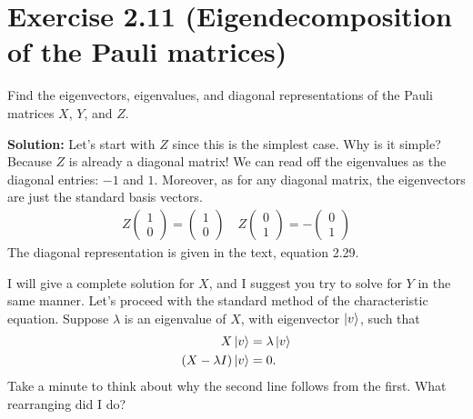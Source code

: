 \documentclass{book}
\begin{document}
\section*{Exercise 2.11 (Eigendecomposition of the Pauli matrices)}
    Find the eigenvectors, eigenvalues, and diagonal representations of the Pauli matrices $X$, $Y$, and $Z$.
    
    \textbf{Solution:} Let's start with $Z$ since this is the simplest case. Why is it simple? Because $Z$ is already a diagonal matrix! We can read off the eigenvalues as the diagonal entries: $-1$ and $1$. Moreover, as for any diagonal matrix, the eigenvectors are just the standard basis vectors.
    \begin{align}
        Z \begin{pmatrix}
            1 \\
            0
        \end{pmatrix}
        = \begin{pmatrix}
            1 \\
            0
        \end{pmatrix}
        \quad Z
        \begin{pmatrix}
            0 \\
            1
        \end{pmatrix}
        = -\begin{pmatrix}
            0 \\
            1
        \end{pmatrix}
    \end{align}
    The diagonal representation is given in the text, equation 2.29.
    
    I will give a complete solution for $X$, and I suggest you try to solve for $Y$ in the same manner. Let's proceed with the standard method of the characteristic equation. Suppose $\lambda$ is an eigenvalue of $X$, with eigenvector $\ket{v}$, such that
    \begin{align} \label{eq:char_matrix}
    \begin{aligned}
        X \ket{v} &= \lambda \ket{v} \\
        (X - \lambda I) \ket{v} &= 0.
    \end{aligned}
    \end{align}
    Take a minute to think about why the second line follows from the first. What rearranging did I do?
    
\end{document}
